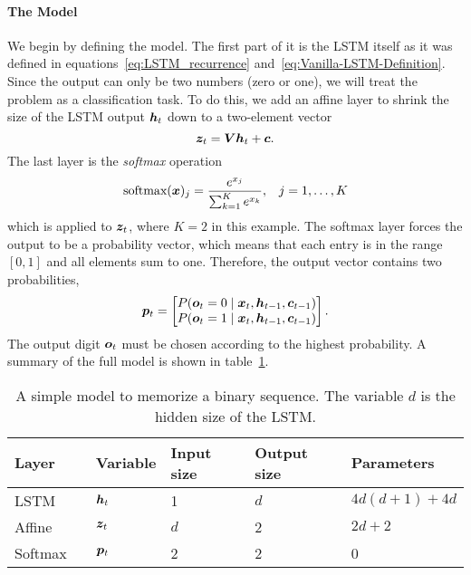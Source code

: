 		\paragraph{The Model}
		We begin by defining the model.
		The first part of it is the LSTM itself as it was defined in equations~\ref{eq:LSTM_recurrence} and~\ref{eq:Vanilla-LSTM-Definition}.
		Since the output can only be two numbers (zero or one), we will treat the problem as a classification task.
		To do this, we add an affine layer to shrink the size of the LSTM output $\bm{h}_t$ down to a two-element vector
		\begin{equation}
			\bm{z}_t = \bm{V} \bm{h}_t + \bm{c}.
		\end{equation}
		The last layer is the \emph{softmax} operation
		\begin{eqnarray}
			\text{softmax}(\bm{x})_j = \frac{e^{x_{j}}}{\sum_{k=1}^{K} e^{x_{k}}},  & & j = 1, \dots, K
		\end{eqnarray}
		which is applied to $\bm{z}_t$, where $K = 2$ in this example.
		The softmax layer forces the output to be a probability vector, which means that each entry is in the range $[0, 1]$ and all elements sum to one.
		Therefore, the output vector contains two probabilities, 
		\begin{equation*}
			\bm{p}_t = 
			\begin{bmatrix}
				P(\bm{o}_t = 0 \mid \bm{x}_t, \bm{h}_{t - 1}, \bm{c}_{t - 1}) \\ 
				P(\bm{o}_t = 1 \mid \bm{x}_t, \bm{h}_{t - 1}, \bm{c}_{t - 1})
			\end{bmatrix}.
		\end{equation*}
		The output digit $\bm{o}_t$ must be chosen according to the highest probability.
		A summary of the full model is shown in table~\ref{tbl:model_classification_binary_digits}.
		\begin{table}[tb]
			\small
			\begin{center}
				\begin{tabular}{lp{0.3cm}llll}
					\toprule
					Layer 	& & Variable 			& Input size 	& Output size 	& Parameters 			\\
					\midrule
					LSTM 	& & $\bm{h}_t$		& 1 			& $d$ 			& $4d(d + 1) + 4d$ 		\\ 
					Affine 	& & $\bm{z}_t$		& $d$ 			& 2 			& $2d + 2$ 				\\ 
					Softmax & & $\bm{p}_t$		& 2 			& 2 			& 0						\\ 
					\bottomrule
				\end{tabular}
			\end{center}
			\caption[A simple model to memorize a binary sequence]
					{A simple model to memorize a binary sequence. 
					 The variable $d$ is the hidden size of the LSTM.
					 \label{tbl:model_classification_binary_digits}}
			
		\end{table}
		
